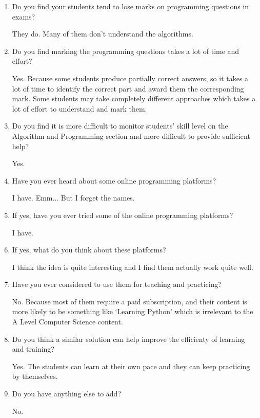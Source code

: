 \documentclass[a4paper]{report}
\begin{document}
\begin{enumerate}
    \item Do you find your students tend to lose marks on programming questions in exams?
    
    They do. Many of them don't understand the algorithms.

    \item Do you find marking the programming questions takes a lot of time and effort?

    Yes. Because some students produce partially correct answers, so it takes a lot of time to identify the correct part and award them the corresponding mark. Some students may take completely different approaches which takes a lot of effort to understand and mark them.
    
    \item Do you find it is more difficult to monitor students' skill level on the Algorithm and Programming section and more difficult to provide sufficient help?
    
    Yes.

    \item Have you ever heard about some online programming platforms?

    I have. Emm... But I forget the names.
    
    \item If yes, have you ever tried some of the online programming platforms?

    I have.
    
    \item If yes, what do you think about these platforms?
    
    I think the idea is quite interesting and I find them actually work quite well.
    
    \item Have you ever considered to use them for teaching and practicing?

    No. Because most of them require a paid subscription, and their content is more likely to be something like `Learning Python' which is irrelevant to the A Level Computer Science content.

    \item Do you think a similar solution can help improve the efficienty of learning and training?

    Yes. The students can learn at their own pace and they can keep practicing by themselves.

    \item Do you have anything else to add?
    
    No.
\end{enumerate}
\end{document}
